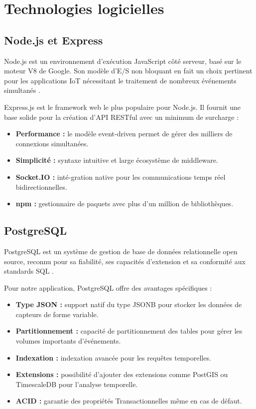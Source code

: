 \section{Technologies logicielles}

\subsection{Node.js et Express}

Node.js est un environnement d'exécution JavaScript côté serveur, basé sur le moteur V8 de Google. Son modèle d'E/S non bloquant en fait un choix pertinent pour les applications IoT nécessitant le traitement de nombreux événements simultanés \cite{tilkov2010node}.

Express.js est le framework web le plus populaire pour Node.js. Il fournit une base solide pour la création d'API RESTful avec un minimum de surcharge :

\begin{itemize}
    \item \textbf{Performance :} le mod\`ele event-driven permet de g\'erer des milliers de connexions simultan\'ees.
    \item \textbf{Simplicit\'e :} syntaxe intuitive et large \'ecosyst\`eme de middleware.
    \item \textbf{Socket.IO :} int\'e-gration native pour les communications temps r\'eel bidirectionnelles.
    \item \textbf{npm :} gestionnaire de paquets avec plus d'un million de biblioth\`eques.
\end{itemize}

\subsection{PostgreSQL}

PostgreSQL est un syst\`eme de gestion de base de donn\'ees relationnelle open source, reconnu pour sa fiabilit\'e, ses capacit\'es d'extension et sa conformit\'e aux standards SQL \cite{momjian2001postgresql}.

Pour notre application, PostgreSQL offre des avantages sp\'ecifiques :

\begin{itemize}
    \item \textbf{Type JSON :} support natif du type JSONB pour stocker les donn\'ees de capteurs de forme variable.
    \item \textbf{Partitionnement :} capacit\'e de partitionnement des tables pour g\'erer les volumes importants d'\'ev\'enements.
    \item \textbf{Indexation :} indexation avanc\'ee pour les requ\^etes temporelles.
    \item \textbf{Extensions :} possibilit\'e d'ajouter des extensions comme PostGIS ou TimescaleDB pour l'analyse temporelle.
    \item \textbf{ACID :} garantie des propri\'et\'es Transactionnelles m\^eme en cas de d\'efaut.
\end{itemize}


